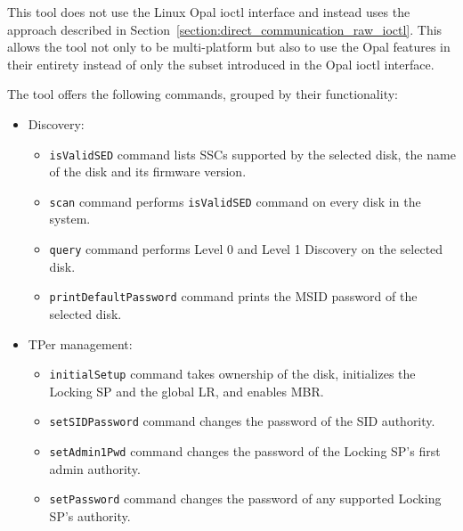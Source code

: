 This tool does not use the Linux Opal ioctl interface and instead uses the approach described in Section~\ref{section:direct_communication_raw_ioctl}. This allows the tool not only to be multi-platform but also to use the Opal features in their entirety instead of only the subset introduced in the Opal ioctl interface.

The tool offers the following commands, grouped by their functionality:
\begin{itemize}
    \item Discovery: \begin{itemize}
\item \verb|isValidSED| command lists SSCs supported by the selected disk, the name of the disk and its firmware version.
\item \verb|scan| command performs \verb|isValidSED| command on every disk in the system.
\item \verb|query| command performs Level 0 and Level 1 Discovery on the selected disk.
\item \verb|printDefaultPassword| command prints the MSID password of the selected disk.
    \end{itemize}
    
    \item TPer management: \begin{itemize}
\item \verb|initialSetup| command takes ownership of the disk, initializes the Locking SP and the global LR, and enables MBR.
\item \verb|setSIDPassword| command changes the password of the SID authority.
\item \verb|setAdmin1Pwd| command changes the password of the Locking SP's first admin authority. 
\item \verb|setPassword| command changes the password of any supported Locking SP's authority.
    \end{itemize}
    

\end{itemize}
